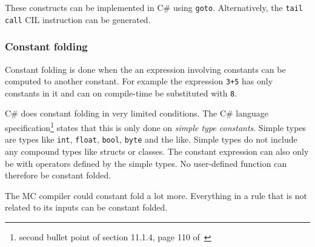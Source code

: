 These constructs can be implemented in C\# using \verb|goto|.
Alternatively, the \verb|tail call| CIL instruction can be generated.

\subsubsection{Constant folding}
Constant folding is done when the an expression involving constants can be computed to another constant.
For example the expression \verb|3+5| has only constants in it and can on compile-time be substituted with \verb|8|. 

C\# does constant folding in very limited conditions.
The C\# language specification\footnote{second bullet point of section 11.1.4, page 110 of~\cite{ecma334}} states that this is only done on \textit{simple type constants}.
Simple types are types like \verb|int|, \verb|float|, \verb|bool|, \verb|byte| and the like.
Simple types do not include any compound types like structs or classes.
The constant expression can also only be with operators defined by the simple types.
No user-defined function can therefore be constant folded.

The MC compiler could constant fold a lot more.
Everything in a rule that is not related to its inputs can be constant folded.

